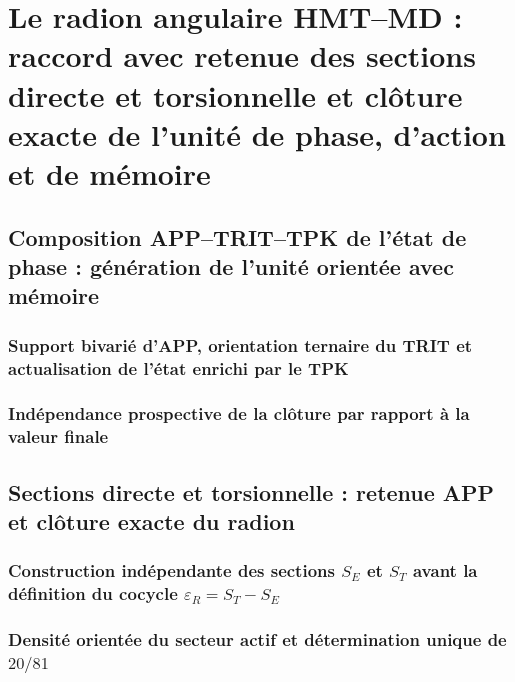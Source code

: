 


\chapter{Le radion angulaire HMT--MD : raccord avec retenue des sections directe et torsionnelle et clôture exacte de l'unité de phase, d'action et de mémoire}
\label{chap:sucesor-102-radion}

\section{Composition APP--TRIT--TPK de l'état de phase : génération de l'unité orientée avec mémoire}


\subsection{Support bivarié d'APP, orientation ternaire du TRIT et actualisation de l'état enrichi par le TPK}


\subsection{Indépendance prospective de la clôture par rapport à la valeur finale}


\section{Sections directe et torsionnelle : retenue APP et clôture exacte du radion}
\subsection{Construction indépendante des sections \(S_E\) et \(S_T\) avant la définition du cocycle \(\varepsilon_R=S_T-S_E\)}

\subsection{Densité orientée du secteur actif et détermination unique de \(20/81\)}

